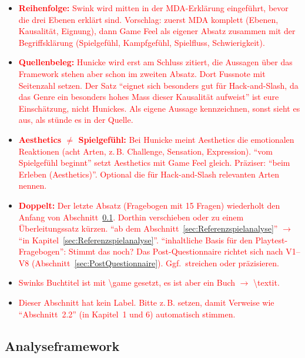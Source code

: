 \documentclass[../Main.tex]{subfiles}
\begin{document}
\begin{itemize}[leftmargin=1.5cm]
    \item \textcolor{red}{\textbf{Reihenfolge:} Swink wird mitten in der MDA-Erklärung eingeführt, bevor die drei Ebenen erklärt sind. Vorschlag: zuerst MDA komplett (Ebenen, Kausalität, Eignung), dann Game Feel als eigener Absatz zusammen mit der Begriffsklärung (Spielgefühl, Kampfgefühl, Spielfluss, Schwierigkeit).}
    \item \textcolor{red}{\textbf{Quellenbeleg:} Hunicke wird erst am Schluss zitiert, die Aussagen über das Framework stehen aber schon im zweiten Absatz. Dort Fussnote mit Seitenzahl setzen. Der Satz \enquote{eignet sich besonders gut für Hack-and-Slash, da das Genre ein besonders hohes Mass dieser Kausalität aufweist} ist eure Einschätzung, nicht Hunickes. Als eigene Aussage kennzeichnen, sonst sieht es aus, als stünde es in der Quelle.}
    \item \textcolor{red}{\textbf{Aesthetics $\neq$ Spielgefühl:} Bei Hunicke meint Aesthetics die emotionalen Reaktionen (acht Arten, z.\,B. Challenge, Sensation, Expression). \enquote{vom Spielgefühl beginnt} setzt Aesthetics mit Game Feel gleich. Präziser: \enquote{beim Erleben (Aesthetics)}. Optional die für Hack-and-Slash relevanten Arten nennen.}
    \item \textcolor{red}{\textbf{Doppelt:} Der letzte Absatz (Fragebogen mit 15 Fragen) wiederholt den Anfang von Abschnitt~\ref{sec:Analysefragebogen}. Dorthin verschieben oder zu einem Überleitungssatz kürzen. \enquote{ab dem Abschnitt~\ref{sec:Referenzspielanalyse}} $\rightarrow$ \enquote{in Kapitel~\ref{sec:Referenzspielanalyse}}. \enquote{inhaltliche Basis für den Playtest-Fragebogen}: Stimmt das noch? Das Post-Questionnaire richtet sich nach V1--V8 (Abschnitt~\ref{sec:PostQuestionnaire}). Ggf.\ streichen oder präzisieren.}
    \item \textcolor{red}{Swinks Buchtitel ist mit \textbackslash game gesetzt, es ist aber ein Buch $\rightarrow$ \textbackslash textit.}
    \item \textcolor{red}{Dieser Abschnitt hat kein Label. Bitte z.\,B.  setzen, damit Verweise wie \enquote{Abschnitt~2.2} (in Kapitel~1 und 6) automatisch stimmen.}
\end{itemize}

\subsection{Analyseframework} \label{sec:Analysefragebogen}
\end{document}
